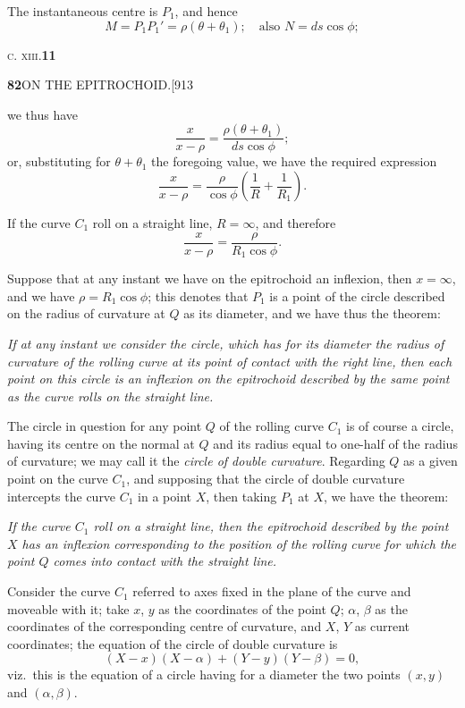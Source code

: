 \documentclass[11pt]{article}
\begin{document}
\hspace{1em} The instantaneous centre is $P_{1}$, and hence
\[
M=P_{1}P_{1}'=\rho(\theta+\theta_{1});\quad \text{also } N=ds\cos\phi;
\]

\hfill\textsc{c. xiii.}\hfill\textbf{11}

\newpage
\noindent\textbf{82}\hfill ON THE EPITROCHOID.\hfill[913

\smallskip
we thus have
\[
\frac{x}{x-\rho}=\frac{\rho(\theta+\theta_{1})}{ds\cos\phi};
\]
or, substituting for $\theta+\theta_{1}$ the foregoing value, we have the
required expression
\[
\frac{x}{x-\rho}=\frac{\rho}{\cos\phi}\left(\frac{1}{R}+\frac{1}{R_{1}}\right).
\]

\hspace{1em} If the curve $C_{1}$ roll on a straight line, $R=\infty$, and therefore
\[
\frac{x}{x-\rho}=\frac{\rho}{R_{1}\cos\phi}.
\]

\hspace{1em} Suppose that at any instant we have on the epitrochoid an
inflexion, then $x=\infty$, and we have $\rho=R_{1}\cos\phi$; this denotes that
$P_{1}$ is a point of the circle described on the radius of curvature at $Q$ as
its diameter, and we have thus the theorem:

\hspace{1em} \emph{If at any instant we consider the circle, which has for its
diameter the radius of curvature of the rolling curve at its point of contact
with the right line, then each point on this circle is an inflexion on the
epitrochoid described by the same point as the curve rolls on the straight
line.}

\hspace{1em} The circle in question for any point $Q$ of the rolling curve
$C_{1}$ is of course a circle, having its centre on the normal at $Q$ and its
radius equal to one-half of the radius of curvature; we may call it the
\emph{circle of double curvature}. Regarding $Q$ as a given point on the curve
$C_{1}$, and supposing that the circle of double curvature intercepts the curve
$C_{1}$ in a point $X$, then taking $P_{1}$ at $X$, we have the theorem:

\hspace{1em} \emph{If the curve $C_{1}$ roll on a straight line, then the
epitrochoid described by the point $X$ has an inflexion corresponding to the
position of the rolling curve for which the point $Q$ comes into contact with
the straight line.}

\hspace{1em} Consider the curve $C_{1}$ referred to axes fixed in the plane of
the curve and moveable with it; take $x$, $y$ as the coordinates of the point
$Q$; $\alpha$, $\beta$ as the coordinates of the corresponding centre of
curvature, and $X$, $Y$ as current coordinates; the equation of the circle of
double curvature is
\[
(X-x)(X-\alpha)+(Y-y)(Y-\beta)=0,
\]
viz.\ this is the equation of a circle having for a diameter the two points
$(x,y)$ and $(\alpha,\beta)$.
\end{document}
